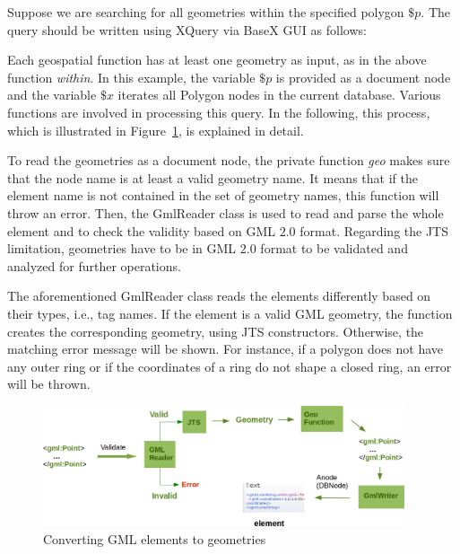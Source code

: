 \documentclass[a4paper,12pt]{article}
\begin{document}
Suppose we are searching for all geometries within the specified polygon $\$p$. The query should be written using XQuery via BaseX GUI as follows:
\vspace{10px}
\vspace{10px}
Each geospatial function has at least one geometry as input, as in the above function \textit{within}. In this example, the variable $\$p$ is provided as a document node and the variable $\$x$ iterates all Polygon nodes in the current database. Various functions are involved in processing this query. In the following, this process, which is illustrated in Figure~\ref{figGeoModuleProcess}, is explained in detail. 

To read the geometries as a document node, the private function \textit{geo} makes sure that the node name is at least a valid geometry name. It means that if the element name is not contained in the set of geometry names, this function will throw an error. 
Then, the GmlReader class is used to read and parse the whole element and to check the validity based on GML $2.0$ format. Regarding the JTS limitation, geometries have to be in GML $2.0$ format to be validated and analyzed for further operations. 

The aforementioned GmlReader class reads the elements differently based on their types, i.e., tag names. If the element is a valid GML geometry, the function creates the corresponding geometry, using JTS constructors. Otherwise, the matching error message will be shown. For instance, if a polygon does not have any outer ring or if the coordinates of a ring do not shape a closed ring, an error will be thrown. 

 \begin{figure}
\centering
\includegraphics[width=0.95\textwidth]{GeoModuleProcess}
\caption{Converting GML elements to geometries}
\label{figGeoModuleProcess}
\end{figure}
\end{document}

